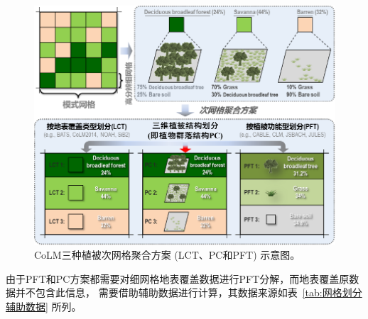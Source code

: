 {
\begin{figure}[]
\centering
\includegraphics{Figures/基础数据/次网格聚合方案.png}
\caption{CoLM三种植被次网格聚合方案 (LCT、PC和PFT) 示意图。}
\label{fig:次网格聚合方案}
\end{figure}
}


由于PFT和PC方案都需要对细网格地表覆盖数据进行PFT分解，而地表覆盖原数据并不包含此信息，
需要借助辅助数据进行计算，其数据来源如表~\ref{tab:网格划分辅助数据} 所列。

